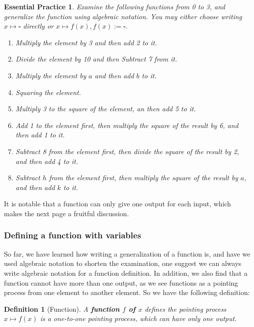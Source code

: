 \documentclass[12pt]{article}
\newtheorem{definition}{Definition}[section]
\newtheorem{exercise}{Essential Practice}[subsection]
\begin{document}
    \begin{exercise}
        Examine the following functions from 0 to 3, and generalize the function using algebraic notation. You may either choose writing $x\mapsto \square$ directly or $x\mapsto f(x), f(x):=\square$.\begin{enumerate}
            \item Multiply the element by 3 and then add 2 to it.
            \item Divide the element by 10 and then Subtract 7 from it.
            \item Multiply the element by $a$ and then add $b$ to it.
            \item Squaring the element.
            \item Multiply 3 to the square of the element, an then add 5 to it.
            \item Add 1 to the element first, then multiply the square of the result by 6, and then add 1 to it.
            \item Subtract 8 from the element first, then divide the square of the result by 2, and then add 4 to it.
            \item Subtract $h$ from the element first, then multiply the square of the result by $a$, and then add $k$ to it.
        \end{enumerate}
    \end{exercise}

    It is notable that a function can only give one output for each input, which makes the next page a fruitful discussion.

    \subsubsection*{Defining a function with variables}

    So far, we have learned how writing a generalization of a function is, and have we used algebraic notation to shorten the examination, one suggest we can always write algebraic notation for a function definition. In addition, we also find that a function cannot have more than one output, as we see functions as a pointing process from one element to another element. So we have the following definition:

    \begin{definition}[Function]
        A \textbf{function $f$ of $x$} defines the pointing process $x\mapsto f(x)$ is a one-to-one pointing process, which can have only one output.
    \end{definition}
\end{document}
